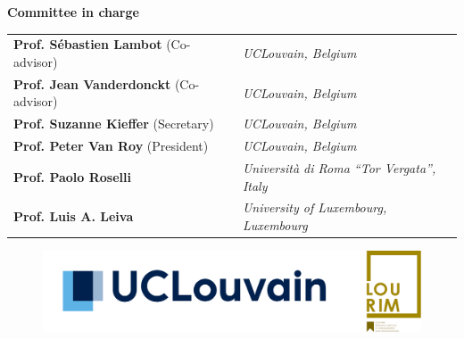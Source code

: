 \documentclass[
  10pt, %
  english, %
  singlespacing, %
]{MastersDoctoralThesis} %
\begin{document}
\begin{titlepage}
  \vspace{1.4cm}
   
  \begin{center}
    \small \textbf{Committee in charge}\\[0.2cm]
    \begin{tabular}{ll}
      \textbf{Prof. S\'ebastien Lambot} (Co-advisor) & \textit{UCLouvain, Belgium} \\
      \textbf{Prof. Jean Vanderdonckt} (Co-advisor) & \textit{UCLouvain, Belgium} \\
      \textbf{Prof. Suzanne Kieffer} (Secretary) & \textit{UCLouvain, Belgium} \\
      \textbf{Prof. Peter Van Roy} (President) & \textit{UCLouvain, Belgium} \\
      \textbf{Prof. Paolo Roselli} & \textit{Università di Roma ``Tor Vergata'', Italy} \\
      \textbf{Prof. Luis A. Leiva} & \textit{University of Luxembourg, Luxembourg} \\
    \end{tabular}  
  \end{center}
  
  \vfill

  \begin{figure}[H]
    \centering
    \includegraphics[scale = 0.13]{Figures/UCLouvain+LouRIM Fused.png}
  \end{figure}


  \setlength{\parindent}{\oldparindent}%
\end{titlepage}
  
\thispagestyle{empty} 





\tableofcontents %
\end{document}
